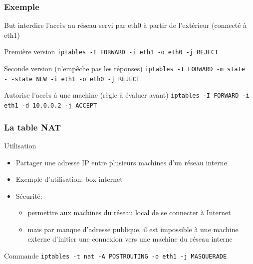 \begin{reveals}
\begin{frame}
  \frametitle{Exemple}
  \vfill
  \begin{block}{But}
    interdire l'accès au réseau servi par eth0 à partir de l'extérieur (connecté à eth1)
  \end{block}
  \pause\vfill 
  \begin{block}{Première version}
    \small\tt iptables -I FORWARD -i eth1 -o eth0 -j REJECT
  \end{block}
   \pause\vfill 
 \begin{block}{Seconde version (n'empêche pas les réponses)}
    \small\tt iptables -I FORWARD -m state -\,-state NEW -i eth1 -o eth0 -j REJECT
  \end{block}
   \pause\vfill 
 \begin{block}{Autorise l'accès à une machine (règle à évaluer avant)}
    \small\tt iptables -I FORWARD  -i eth1 -d 10.0.0.2 -j ACCEPT
  \end{block}
  \vfill
\end{frame}


\begin{frame}
  \frametitle{La table NAT}
  \vfill
  \begin{block}{Utilisation}
    \begin{itemize}
    \item Partager une adresse IP entre plusieurs machines d'un réseau interne
    \item Exemple d'utilisation: box internet
    \item Sécurité:
      \begin{itemize}
      \item permettre aux machines du réseau local de se connecter à
        Internet
      \item mais par manque d'adresse publique, il est impossible à
        une machine externe d'initier une connexion vers une machine
        du réseau interne
      \end{itemize}
    \end{itemize}
  \end{block}
  \vfill
  \begin{block}{Commande}
    \small\tt iptables -t nat -A POSTROUTING -o eth1 -j MASQUERADE
  \end{block}
\end{frame}
  
\end{reveals}

 
